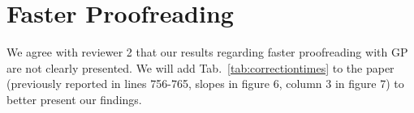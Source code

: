 \documentclass[10pt,twocolumn,letterpaper]{article}
\begin{document}
\begin{table}[h]
\caption{Training data of membrane detection vs. training data of GP (for supplemental material).}%
\label{tab:trainingdata}
\end{table}


\section{Faster Proofreading}
We agree with reviewer 2 that our results regarding faster proofreading with GP are not clearly presented. 
We will add Tab.~\ref{tab:correctiontimes} to the paper (previously reported in lines 756-765, slopes in figure 6, column 3 in figure 7) to better present our findings.

\begin{table}[h]
\caption{Average proofreading speed for novice users of Dojo, FP and GP. Higher VI reduction per minute shows better performance of GP.}%
\label{tab:correctiontimes}
\end{table}
\end{document}
